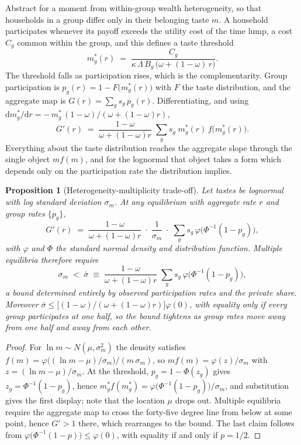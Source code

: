 \documentclass[11pt]{article}
\newtheorem{proposition}{Proposition}
\begin{document}
Abstract for a moment from within-group wealth heterogeneity, so that households in a group differ only in their belonging taste $m$. A household participates whenever its payoff exceeds the utility cost of the time lump, a cost $C_g$ common within the group, and this defines a taste threshold
\[
m^*_g(r) \;=\; \frac{C_g}{\kappa\,\Lambda\,B_g\,\bigl(\omega + (1-\omega)\,r\bigr)} .
\]
The threshold falls as participation rises, which is the complementarity. Group participation is $p_g(r) = 1 - F\bigl(m^*_g(r)\bigr)$ with $F$ the taste distribution, and the aggregate map is $G(r) = \sum_g s_g\, p_g(r)$. Differentiating, and using $\mathrm{d}m^*_g/\mathrm{d}r = -\,m^*_g\,(1-\omega)/(\omega+(1-\omega)r)$,
\[
G'(r) \;=\; \frac{1-\omega}{\omega+(1-\omega)r}\;\sum_g s_g\; m^*_g(r)\, f\bigl(m^*_g(r)\bigr) .
\]
Everything about the taste distribution reaches the aggregate slope through the single object $m f(m)$, and for the lognormal that object takes a form which depends only on the participation rate the distribution implies.

\begin{proposition}[Heterogeneity-multiplicity trade-off]
Let tastes be lognormal with log standard deviation $\sigma_m$. At any equilibrium with aggregate rate $r$ and group rates $\{p_g\}$,
\[
G'(r) \;=\; \frac{1-\omega}{\omega+(1-\omega)r}\;\cdot\;\frac{1}{\sigma_m}\;\cdot\;\sum_g s_g\,\varphi\bigl(\Phi^{-1}(1-p_g)\bigr),
\]
with $\varphi$ and $\Phi$ the standard normal density and distribution function. Multiple equilibria therefore require
\[
\sigma_m \;<\; \bar\sigma \;\equiv\; \frac{1-\omega}{\omega+(1-\omega)r}\;\sum_g s_g\,\varphi\bigl(\Phi^{-1}(1-p_g)\bigr),
\]
a bound determined entirely by observed participation rates and the private share. Moreover $\bar\sigma \le \bigl[(1-\omega)/(\omega+(1-\omega)r)\bigr]\varphi(0)$, with equality only if every group participates at one half, so the bound tightens as group rates move away from one half and away from each other.
\end{proposition}

\begin{proof}
For $\ln m \sim N(\mu, \sigma_m^2)$ the density satisfies $f(m) = \varphi\bigl((\ln m - \mu)/\sigma_m\bigr)/(m\,\sigma_m)$, so $m f(m) = \varphi(z)/\sigma_m$ with $z = (\ln m - \mu)/\sigma_m$. At the threshold, $p_g = 1 - \Phi(z_g)$ gives $z_g = \Phi^{-1}(1-p_g)$, hence $m^*_g f(m^*_g) = \varphi\bigl(\Phi^{-1}(1-p_g)\bigr)/\sigma_m$, and substitution gives the first display; note that the location $\mu$ drops out. Multiple equilibria require the aggregate map to cross the forty-five degree line from below at some point, hence $G' > 1$ there, which rearranges to the bound. The last claim follows from $\varphi\bigl(\Phi^{-1}(1-p)\bigr) \le \varphi(0)$, with equality if and only if $p = 1/2$.
\end{proof}
\end{document}
